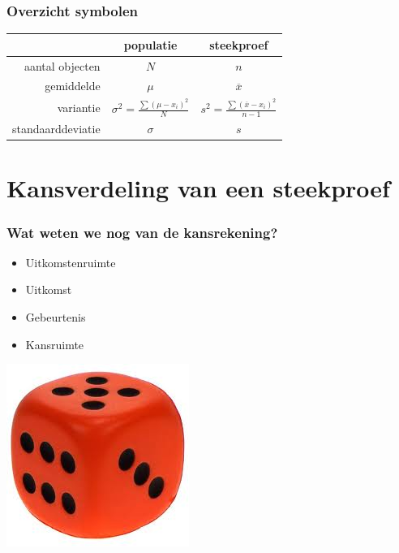 \documentclass{beamer}
\begin{document}
\begin{frame}
\frametitle{Overzicht symbolen}

{\tabulinesep=1.2mm
\begin{tabu}{|r|c|c|}
    \hline
    & populatie & steekproef \\
    \hline
    aantal objecten & $N$ & $n$ \\
    \hline
    gemiddelde & $\mu$ & $\overline{x}$ \\
    \hline
    variantie & $\sigma^2 = \frac{\sum (\mu-x_i)^2}{N}$ & $s^2  = \frac{\sum (\overline{x}-x_i)^2}{n-1}$ \\
    \hline
    standaarddeviatie & $\sigma$ & $s$ \\
    \hline
\end{tabu}}
\end{frame}


\section{Kansverdeling van een steekproef}

\begin{frame}
  \frametitle{Wat weten we nog van de kansrekening?}

  \begin{itemize}
    \item Uitkomstenruimte
    \item Uitkomst
    \item Gebeurtenis
    \item Kansruimte
  \end{itemize}

  \vfill

  \hfill \includegraphics[width=.2\textwidth]{img/les04-dobbelsteen}
\end{frame}
\end{document}

